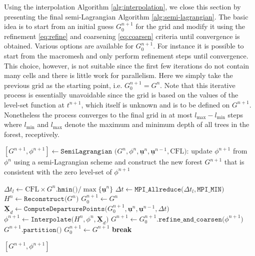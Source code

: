 Using the interpolation Algorithm \ref{alg:interpolation}, we close this section by presenting the final semi-Lagrangian Algorithm \ref{alg:semi-lagrangian}. The basic idea is to start from an initial guess $G^{n+1}_0$ for the grid and modify it using the refinement \eqref{eq:refine} and coarsening \eqref{eq:coarsen} criteria until convergence is obtained. Various options are available for $G^{n+1}_0$. For instance it is possible to start from the macromesh and only perform refinement steps until convergence. This choice, however, is not suitable since the first few iterations do not contain many cells and there is little work for parallelism. Here we simply take the previous grid as the starting point, i.e. $G^{n+1}_0 = G^n$. Note that this iterative process is essentially unavoidable since the grid is based on the values of the level-set function at $t^{n+1}$, which itself is unknown and is to be defined on $G^{n+1}$. Nonetheless the process converges to the final grid in at most $l_{\max}-l_{\min}$ steps where $l_{\min}$ and $l_{\max}$ denote the maximum and minimum depth of all trees in the forest, receptively.
\begin{algorithm}[htbp]
\caption{$[G^{n+1}, \phi^{n+1}] \gets \texttt{SemiLagrangian (}G^n, \phi^n, \underline{\mathbf{u}}^n, \underline{\mathbf{u}}^{n-1}, \text{CFL}\texttt{)}$: update $\phi^{n+1}$ from $\phi^n$ using a semi-Lagrangian scheme and construct the new forest $G^{n+1}$ that is consistent with the zero level-set of $\phi^{n+1}$}
\begin{algorithmic}[1]
\State $\Delta t_l \gets \text{CFL} \times G^n.\texttt{hmin()} / \max \{\underline{\mathbf{u}}^n \} $
\State $\Delta t   \gets \texttt{MPI\_Allreduce(}\Delta t_l,\texttt{MPI\_MIN)}$
\State $H^n \gets \texttt{Reconstruct(} G^n\texttt{)}$ 
\State $G^{n+1}_0 \gets G^n$
	\State $\underline{\mathbf{X}}_d  \gets \texttt{ComputeDeparturePoints(}G^{n+1}_0, \underline{\mathbf{u}}^n, \underline{\mathbf{u}}^{n-1}, \Delta t\texttt{)}$ 
	\State $\phi^{n+1} \gets \texttt{Interpolate(}H^n, \phi^n, \underline{\textbf{X}}_d\texttt{)}$
	\State $G^{n+1} \gets G^{n+1}_0.\texttt{refine\_and\_coarsen(}\phi^{n+1}\texttt{)}$ 
		\State $G^{n+1}.\texttt{partition()}$
		\State $G^{n+1}_0 \gets G^{n+1}$
	\Else
		\State \textbf{break}
	\EndIf
\EndWhile

\State \Return $[G^{n+1}, \phi^{n+1}]$
\end{algorithmic}
\label{alg:semi-lagrangian}
\end{algorithm}

